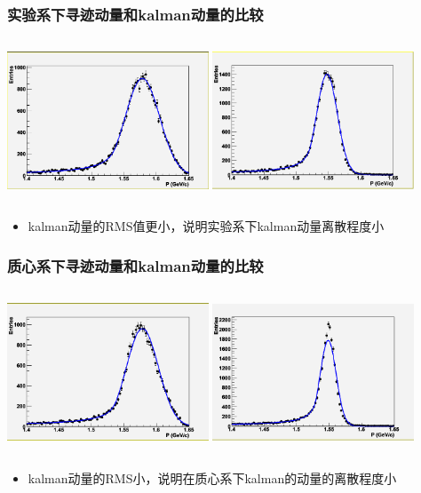 \documentclass{beamer}
\begin{document}
\begin{frame}
    \frametitle{实验系下寻迹动量和kalman动量的比较}
    \begin{columns}
        \column{6.0cm}
        \includegraphics[width=6cm, keepaspectratio]{data/p.png}
        \column{6.0cm}
        \includegraphics[width=6cm, keepaspectratio]{data/p_kal.png}
    \end{columns}
    \begin{itemize}
        \item kalman动量的RMS值更小，说明实验系下kalman动量离散程度小 
    \end{itemize}

\end{frame}


\begin{frame}
    \frametitle{质心系下寻迹动量和kalman动量的比较}
    \begin{columns}
        \column{6.0cm}
        \includegraphics[width=6cm, keepaspectratio]{data/pcms.png}
        \column{6.0cm}
        \includegraphics[width=6cm, keepaspectratio]{data/pcms_kal.png}
    \end{columns}
    \begin{itemize}
        \item kalman动量的RMS小，说明在质心系下kalman的动量的离散程度小
    \end{itemize}

\end{frame}
\end{document}
